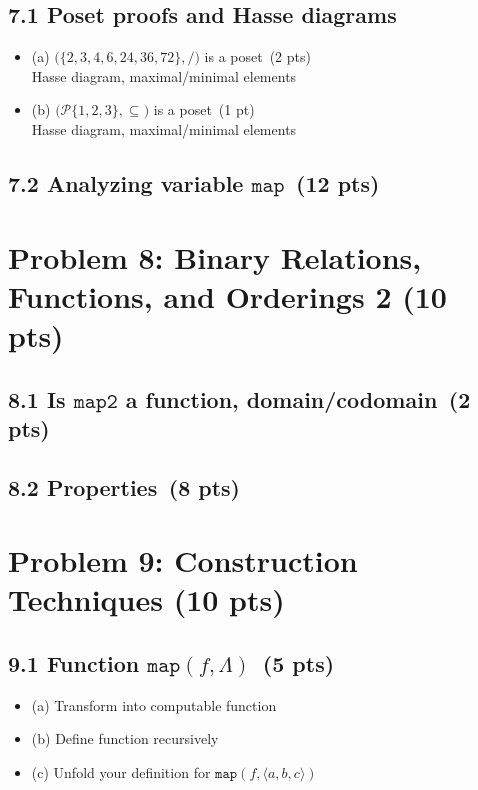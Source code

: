 \documentclass[11pt]{article}
\begin{document}
\subsection*{7.1 Poset proofs and Hasse diagrams}
\begin{itemize}
    \item (a) \(\bigl(\{2,3,4,6,24,36,72\}, /\bigr)\) is a poset \,(2 pts) \\
          Hasse diagram, maximal/minimal elements
    \item (b) \(\bigl(\mathcal{P}\{1,2,3\}, \subseteq\bigr)\) is a poset \,(1 pt) \\
          Hasse diagram, maximal/minimal elements
\end{itemize}

\subsection*{7.2 Analyzing variable \(\texttt{map}\) \,(12 pts)}

\newpage
\section{Problem 8: Binary Relations, Functions, and Orderings 2 (10 pts)}

\subsection*{8.1 Is \(\texttt{map2}\) a function, domain/codomain \,(2 pts)}

\subsection*{8.2 Properties \,(8 pts)}

\newpage
\section{Problem 9: Construction Techniques (10 pts)}

\subsection*{9.1 Function \(\texttt{map}(f,\Lambda)\) \,(5 pts)}
\begin{itemize}
    \item (a) Transform into computable function
    \item (b) Define function recursively
    \item (c) Unfold your definition for \(\texttt{map}(f,\langle a,b,c\rangle)\)
\end{itemize}
\end{document}
